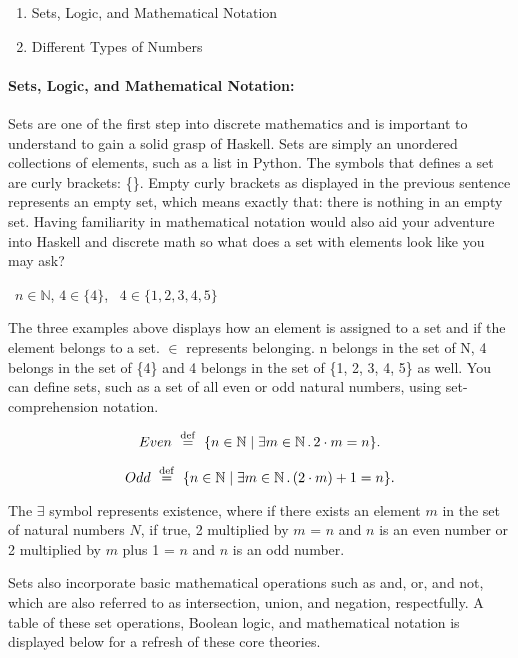 \documentclass{article}
\begin{document}
\begin{enumerate}
    \item Sets, Logic, and Mathematical Notation
    \item Different Types of Numbers
\end{enumerate}

\paragraph{Sets, Logic, and Mathematical Notation:}
Sets are one of the first step into discrete mathematics and is important to understand to gain a solid grasp of Haskell. Sets are simply an unordered collections of elements, such as a list in Python. The symbols that defines a set are curly brackets: \{\}. Empty curly brackets as displayed in the previous sentence represents an empty set, which means exactly that: there is nothing in an empty set. Having familiarity in mathematical notation would also aid your adventure into Haskell and discrete math so what does a set with elements look like you may ask?

\begin{center}
\ $n\in \mathbb N$, $4\in \{4\}$, \ $4\in \{1, 2, 3, 4, 5\}$
\end{center}

\noindent
The three examples above displays how an element is assigned to a set and if the element belongs to a set. $\in$ represents belonging. n belongs in the set of N, 4 belongs in the set of \{4\} and 4 belongs in the set of \{1, 2, 3, 4, 5\} as well. You can define sets, such as a set of all even or odd natural numbers, using set-comprehension notation.

 $$Even \ \stackrel{\rm def}{=} \ \{ n\in\mathbb N \mid \exists  m\in\mathbb N\,.\, 2\cdot m = n \}.$$

$$Odd \ \stackrel{\rm def}{=} \ \{ n\in\mathbb N \mid \exists  m\in\mathbb N\,.\, (2\cdot m) + 1 = n \}.$$

\noindent The $\exists$ symbol represents existence, where if there exists an element $m$ in the set of natural numbers $N$, if true, 2 multiplied by $m$ = $n$ and $n$ is an even number or 2 multiplied by $m$ plus 1 = $n$ and $n$ is an odd number. 

\medskip\noindent
 Sets also incorporate basic mathematical operations such as and, or, and not, which are also referred to as intersection, union, and negation, respectfully. A table of these set operations, Boolean logic, and mathematical notation is displayed below for a refresh of these core theories.
\end{document}
